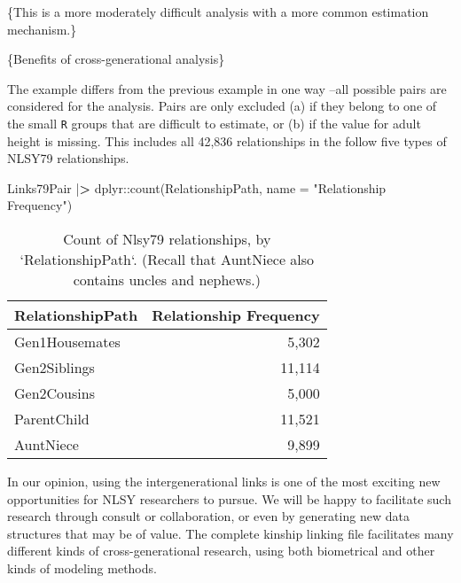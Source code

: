\documentclass[smallextended]{svjour3}       %
\newenvironment{Shaded}{\begin{snugshade}}{\end{snugshade}}
\newcommand{\AttributeTok}[1]{\textcolor[rgb]{0.77,0.63,0.00}{#1}}
\newcommand{\ErrorTok}[1]{\textcolor[rgb]{0.64,0.00,0.00}{\textbf{#1}}}
\newcommand{\FunctionTok}[1]{\textcolor[rgb]{0.00,0.00,0.00}{#1}}
\newcommand{\NormalTok}[1]{#1}
\newcommand{\SpecialCharTok}[1]{\textcolor[rgb]{0.00,0.00,0.00}{#1}}
\newcommand{\StringTok}[1]{\textcolor[rgb]{0.31,0.60,0.02}{#1}}
\begin{document}
\{This is a more moderately difficult analysis with a more common
estimation mechanism.\}

\{Benefits of cross-generational analysis\}

The example differs from the previous example in one way --all possible
pairs are considered for the analysis. Pairs are only excluded (a) if
they belong to one of the small \texttt{R} groups that are difficult to
estimate, or (b) if the value for adult height is missing. This includes
all 42,836 relationships in the follow five types of NLSY79
relationships.

\begin{Shaded}
\begin{Highlighting}[]
\NormalTok{Links79Pair }\SpecialCharTok{|}\ErrorTok{\textgreater{}}
\NormalTok{  dplyr}\SpecialCharTok{::}\FunctionTok{count}\NormalTok{(RelationshipPath, }\AttributeTok{name =} \StringTok{"Relationship Frequency"}\NormalTok{)}
\end{Highlighting}
\end{Shaded}

\begin{table}

\caption{\label{tab:unnamed-chunk-6}Count of Nlsy79 relationships, by `RelationshipPath`.  (Recall that AuntNiece also contains uncles and nephews.)}
\centering
\begin{tabular}[t]{l|r}
\hline
RelationshipPath & Relationship Frequency\\
\hline
Gen1Housemates & 5,302\\
\hline
Gen2Siblings & 11,114\\
\hline
Gen2Cousins & 5,000\\
\hline
ParentChild & 11,521\\
\hline
AuntNiece & 9,899\\
\hline
\end{tabular}
\end{table}

In our opinion, using the intergenerational links is one of the most
exciting new opportunities for NLSY researchers to pursue. We will be
happy to facilitate such research through consult or collaboration, or
even by generating new data structures that may be of value. The
complete kinship linking file facilitates many different kinds of
cross-generational research, using both biometrical and other kinds of
modeling methods.
\end{document}
